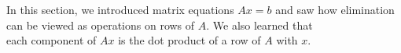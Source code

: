 \documentclass[preview]{standalone}
\begin{document}
\begin{center}
In this section, we introduced matrix equations $Ax = b$ and saw how elimination \\ can be viewed as operations on rows of $A$. We also learned that \\ each component of $Ax$ is the dot product of a row of $A$ with $x.$
\end{center}
\end{document}
